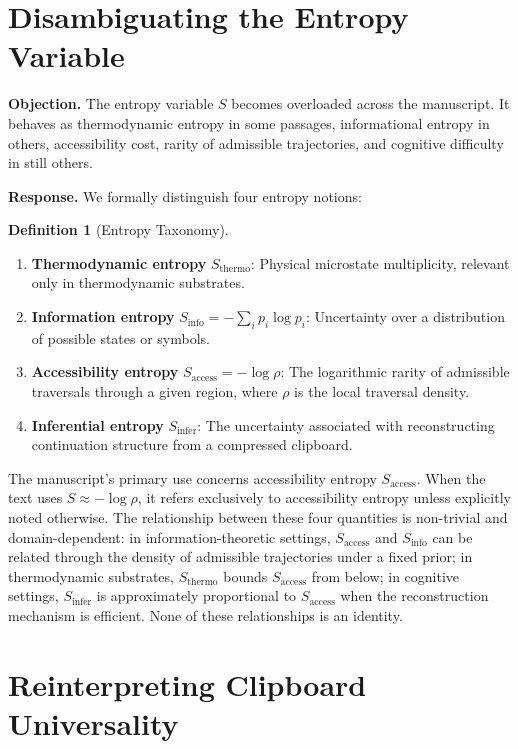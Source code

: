 \documentclass[12pt,oneside]{book}
\theoremstyle{plain}
\theoremstyle{definition}
\newtheorem{definition}[theorem]{Definition}
\theoremstyle{plain}
\begin{document}
\section{Disambiguating the Entropy Variable}

\textbf{Objection.} The entropy variable $S$ becomes overloaded across the manuscript. It behaves as thermodynamic entropy in some passages, informational entropy in others, accessibility cost, rarity of admissible trajectories, and cognitive difficulty in still others.

\textbf{Response.} We formally distinguish four entropy notions:

\begin{definition}[Entropy Taxonomy]
\begin{enumerate}[noitemsep]
\item \textbf{Thermodynamic entropy} $S_{\text{thermo}}$: Physical microstate multiplicity, relevant only in thermodynamic substrates.
\item \textbf{Information entropy} $S_{\text{info}} = -\sum_i p_i \log p_i$: Uncertainty over a distribution of possible states or symbols.
\item \textbf{Accessibility entropy} $S_{\text{access}} = -\log \rho$: The logarithmic rarity of admissible traversals through a given region, where $\rho$ is the local traversal density.
\item \textbf{Inferential entropy} $S_{\text{infer}}$: The uncertainty associated with reconstructing continuation structure from a compressed clipboard.
\end{enumerate}
\end{definition}

The manuscript's primary use concerns accessibility entropy $S_{\text{access}}$. When the text uses $S \approx -\log \rho$, it refers exclusively to accessibility entropy unless explicitly noted otherwise. The relationship between these four quantities is non-trivial and domain-dependent: in information-theoretic settings, $S_{\text{access}}$ and $S_{\text{info}}$ can be related through the density of admissible trajectories under a fixed prior; in thermodynamic substrates, $S_{\text{thermo}}$ bounds $S_{\text{access}}$ from below; in cognitive settings, $S_{\text{infer}}$ is approximately proportional to $S_{\text{access}}$ when the reconstruction mechanism is efficient. None of these relationships is an identity.

\section{Reinterpreting Clipboard Universality}
\end{document}
